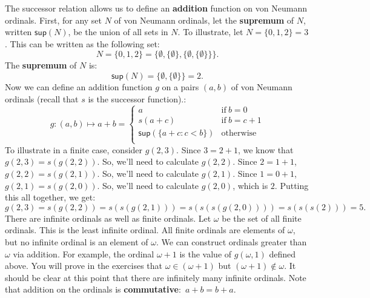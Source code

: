 \documentclass[11pt]{article}
\theoremstyle{definition}
\theoremstyle{remark}
\begin{document}
The successor relation allows us to define an \textbf{addition} function on von Neumann ordinals. First, for any set $N$ of von Neumann ordinals, let the \textbf{supremum} of $N$, written $\textsf{sup}(N)$, be the union of all sets in $N$. To illustrate, let $N=\{0,1,2\}=3$. This can be written as the following set:
$$N=\{0,1,2\}=\{\emptyset,\{\emptyset\},\{\emptyset,\{\emptyset\}\}\}.$$
The \textbf{supremum} of $N$ is:
$$\textsf{sup}(N)=\{\emptyset,\{\emptyset\}\}=2.$$
Now we can define an addition function $g$ on a pairs $(a,b)$ of von Neumann ordinals (recall that $s$ is the successor function).:
\begin{equation}
    g:(a,b)\mapsto a+b = \begin{cases}
        a & \text{if} \ b=0\\
        s(a+c) & \text{if} \ b=c+1\\
        \textsf{sup}(\{a+c:c<b\}) & \text{otherwise}\\
    \end{cases}
\end{equation}
To illustrate in a finite case, consider $g(2,3)$. Since $3=2+1$, we know that $g(2,3)=s(g(2,2))$. So, we'll need to calculate $g(2,2)$. Since $2=1+1$, $g(2,2)=s(g(2,1))$. So, we'll need to calculate $g(2,1)$. Since $1=0+1$, $g(2,1)=s(g(2,0))$. So, we'll need to calculate $g(2,0)$, which is $2$. Putting this all together, we get:
$$g(2,3)=s(g(2,2))=s(s(g(2,1)))=s(s(s(g(2,0))))=s(s(s(2)))=5.$$
There are infinite ordinals as well as finite ordinals. Let $\omega$ be the set of all finite ordinals. This is the least infinite ordinal. All finite ordinals are elements of $\omega$, but no infinite ordinal is an element of $\omega$. We can construct ordinals greater than $\omega$ via addition. For example, the ordinal $\omega + 1$ is the value of $g(\omega,1)$ defined above. You will prove in the exercises that $\omega\in(\omega+1)$ but $(\omega + 1)\not\in\omega$. It should be clear at this point that there are infinitely many infinite ordinals. Note that addition on the ordinals is \textbf{commutative}:\ $a+b=b+a$.
\end{document}
